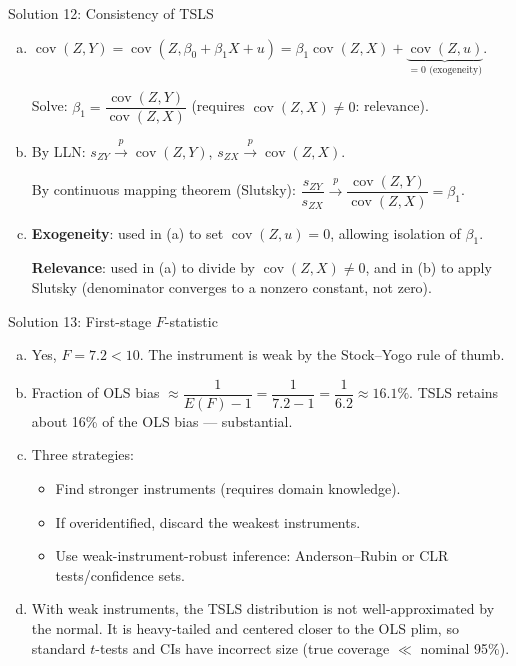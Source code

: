 \documentclass[10pt]{beamer}
\begin{document}
\begin{frame}{Solution 12: Consistency of TSLS}
\label{s12}
\begin{enumerate}[(a)]
  \item $\operatorname{cov}(Z, Y) = \operatorname{cov}(Z, \beta_0 + \beta_1 X + u) = \beta_1\operatorname{cov}(Z,X) + \underbrace{\operatorname{cov}(Z,u)}_{=0 \text{ (exogeneity)}}$.

  Solve: $\beta_1 = \dfrac{\operatorname{cov}(Z,Y)}{\operatorname{cov}(Z,X)}$ \quad (requires $\operatorname{cov}(Z,X) \neq 0$: \alert{relevance}).

  \item By LLN: $s_{ZY} \xrightarrow{p} \operatorname{cov}(Z,Y)$, $s_{ZX} \xrightarrow{p} \operatorname{cov}(Z,X)$.

  By continuous mapping theorem (Slutsky): $\dfrac{s_{ZY}}{s_{ZX}} \xrightarrow{p} \dfrac{\operatorname{cov}(Z,Y)}{\operatorname{cov}(Z,X)} = \beta_1$. \checkmark

  \item \textbf{Exogeneity}: used in (a) to set $\operatorname{cov}(Z,u) = 0$, allowing isolation of $\beta_1$.

  \textbf{Relevance}: used in (a) to divide by $\operatorname{cov}(Z,X) \neq 0$, and in (b) to apply Slutsky (denominator converges to a nonzero constant, not zero).
\end{enumerate}

\vfill
\hfill\hyperlink{q12}{}
\end{frame}

\begin{frame}{Solution 13: First-stage $F$-statistic}
\label{s13}
\begin{enumerate}[(a)]
  \item Yes, $F = 7.2 < 10$. The instrument is \alert{weak} by the Stock--Yogo rule of thumb.

  \item Fraction of OLS bias $\approx \dfrac{1}{E(F) - 1} = \dfrac{1}{7.2 - 1} = \dfrac{1}{6.2} \approx \boxed{16.1\%}$. TSLS retains about 16\% of the OLS bias --- substantial.

  \item Three strategies:
  \begin{itemize}
    \item Find stronger instruments (requires domain knowledge).
    \item If overidentified, discard the weakest instruments.
    \item Use weak-instrument-robust inference: Anderson--Rubin or CLR tests/confidence sets.
  \end{itemize}

  \item With weak instruments, the TSLS distribution is \alert{not well-approximated by the normal}. It is heavy-tailed and centered closer to the OLS plim, so standard $t$-tests and CIs have incorrect size (true coverage $\ll$ nominal 95\%).
\end{enumerate}

\vfill
\hfill\hyperlink{q13}{}
\end{frame}
\end{document}
